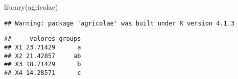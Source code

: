\documentclass[
]{article}
\newenvironment{Shaded}{\begin{snugshade}}{\end{snugshade}}
\newcommand{\AttributeTok}[1]{\textcolor[rgb]{0.77,0.63,0.00}{#1}}
\newcommand{\ConstantTok}[1]{\textcolor[rgb]{0.00,0.00,0.00}{#1}}
\newcommand{\FloatTok}[1]{\textcolor[rgb]{0.00,0.00,0.81}{#1}}
\newcommand{\FunctionTok}[1]{\textcolor[rgb]{0.00,0.00,0.00}{#1}}
\newcommand{\NormalTok}[1]{#1}
\newcommand{\OtherTok}[1]{\textcolor[rgb]{0.56,0.35,0.01}{#1}}
\newcommand{\SpecialCharTok}[1]{\textcolor[rgb]{0.00,0.00,0.00}{#1}}
\newcommand{\StringTok}[1]{\textcolor[rgb]{0.31,0.60,0.02}{#1}}
\begin{document}
\begin{Shaded}
\begin{Highlighting}[]
\FunctionTok{library}\NormalTok{(agricolae)}
\end{Highlighting}
\end{Shaded}

\begin{verbatim}
## Warning: package 'agricolae' was built under R version 4.1.3
\end{verbatim}

\begin{Shaded}
\end{Shaded}

\begin{verbatim}
##     valores groups
## X1 23.71429      a
## X2 21.42857     ab
## X3 18.71429      b
## X4 14.28571      c
\end{verbatim}
\end{document}
